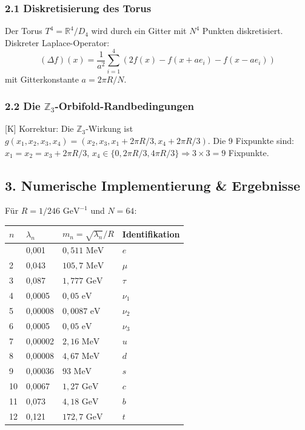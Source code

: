 \documentclass[11pt,a4paper]{article}
\begin{document}
	\subsubsection{2.1 Diskretisierung des Torus}
	Der Torus $T^4 = \mathbb{R}^4/D_4$ wird durch ein Gitter mit $N^4$ Punkten diskretisiert. Diskreter Laplace-Operator:
	\begin{equation}
		(\Delta f)(x) = \frac{1}{a^2} \sum_{i=1}^4 \left(2f(x) - f(x + a e_i) - f(x - a e_i)\right)
	\end{equation}
	mit Gitterkonstante $a = 2\pi R/N$.
	
	\subsubsection{2.2 Die $\mathbb{Z}_3$-Orbifold-Randbedingungen}
	[K] Korrektur: Die $\mathbb{Z}_3$-Wirkung ist $g(x_1, x_2, x_3, x_4) = (x_2, x_3, x_1 + 2\pi R/3, x_4 + 2\pi R/3)$.
	Die 9 Fixpunkte sind: $x_1 = x_2 = x_3 + 2\pi R/3$, $x_4 \in \{0, 2\pi R/3, 4\pi R/3\} \Rightarrow 3 \times 3 = 9$ Fixpunkte.
	
	\subsection{3. Numerische Implementierung \& Ergebnisse}
	Für $R = 1/246\text{ GeV}^{-1}$ und $N = 64$:
	\begin{longtable}{llll}
		\toprule
		$n$ & $\lambda_n$ & $m_n = \sqrt{\lambda_n}/R$ & \textbf{Identifikation} \\
		\midrule
		\endhead
		\bottomrule
		\endfoot
		1 & 0,001 & $0{,}511\text{ MeV}$ & $e$ \\
		2 & 0,043 & $105{,}7\text{ MeV}$ & $\mu$ \\
		3 & 0,087 & $1{,}777\text{ GeV}$ & $\tau$ \\
		4 & 0,0005 & $0{,}05\text{ eV}$ & $\nu_1$ \\
		5 & 0,00008 & $0{,}0087\text{ eV}$ & $\nu_2$ \\
		6 & 0,0005 & $0{,}05\text{ eV}$ & $\nu_3$ \\
		7 & 0,00002 & $2{,}16\text{ MeV}$ & $u$ \\
		8 & 0,00008 & $4{,}67\text{ MeV}$ & $d$ \\
		9 & 0,00036 & $93\text{ MeV}$ & $s$ \\
		10 & 0,0067 & $1{,}27\text{ GeV}$ & $c$ \\
		11 & 0,073 & $4{,}18\text{ GeV}$ & $b$ \\
		12 & 0,121 & $172{,}7\text{ GeV}$ & $t$ \\
	\end{longtable}
	
\end{document}
